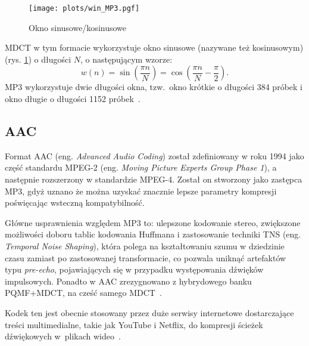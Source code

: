 \documentclass[pl,12pt]{aghdpl}
\let\Oldsubsection\subsection%
\renewcommand{\subsection}{\FloatBarrier\Oldsubsection}
\begin{document}
\begin{figure}[!tbh]
  \centering
  \texttt{[image: plots/win\_MP3.pgf]}
  \caption{Okno sinusowe/kosinusowe}
  \label{fig:win_MP3}
\end{figure}

MDCT w tym formacie wykorzystuje okno sinusowe (nazywane też kosinusowym) (rys.
\ref{fig:win_MP3}) o długości $N$, o następującym wzorze:
\begin{equation}\label{eq:sine_win}
  w(n) = \sin\left(\frac{\pi n}{N}\right) = \cos\left(\frac{\pi n}{N} - \frac{\pi}{2}\right).
\end{equation}
MP3 wykorzystuje dwie długości okna, tzw.\ okno krótkie o długości 384 próbek i okno
długie o długości 1152 próbek~\cite{KimRafii2018}.

\subsection{AAC}
Format AAC (eng. \textit{Advanced Audio Coding}) został zdefiniowany w roku 1994
jako część standardu MPEG-2 (eng. \textit{Moving Picture Experts Group Phase
1}), a następnie rozszerzony w standardzie MPEG-4. Został on stworzony jako
zastępca MP3, gdyż uznano że można uzyskać znacznie lepsze parametry kompresji
poświęcając wsteczną kompatybilność.

Główne usprawnienia względem MP3 to: ulepszone kodowanie stereo, zwiększone
możliwości doboru tablic kodowania Huffmana i zastosowanie techniki TNS (eng.
\textit{Temporal Noise Shaping}), która polega na kształtowaniu szumu w
dziedzinie czasu zamiast po zastosowanej transformacie, co pozwala uniknąć
artefaktów typu \textit{pre-echo}, pojawiających się w przypadku występowania
dźwięków impulsowych. Ponadto w AAC zrezygnowano z hybrydowego banku PQMF+MDCT,
na cześć samego MDCT~\cite{Brandenburg1999}.

Kodek ten jest obecnie stosowany przez duże serwisy internetowe dostarczające
treści multimedialne, takie jak YouTube i Netflix, do kompresji ścieżek
dźwiękowych w~plikach wideo~\cite{YouTubeRecommended, Ronca2013}.
\end{document}

